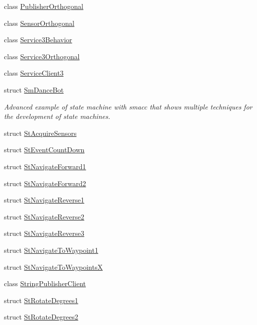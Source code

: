 \begin{DoxyCompactItemize}
\item 
class \hyperlink{classsm__dance__bot_1_1PublisherOrthogonal}{Publisher\+Orthogonal}
\item 
class \hyperlink{classsm__dance__bot_1_1SensorOrthogonal}{Sensor\+Orthogonal}
\item 
class \hyperlink{classsm__dance__bot_1_1Service3Behavior}{Service3\+Behavior}
\item 
class \hyperlink{classsm__dance__bot_1_1Service3Orthogonal}{Service3\+Orthogonal}
\item 
class \hyperlink{classsm__dance__bot_1_1ServiceClient3}{Service\+Client3}
\item 
struct \hyperlink{structsm__dance__bot_1_1SmDanceBot}{Sm\+Dance\+Bot}
\begin{DoxyCompactList}\small\item\em Advanced example of state machine with smacc that shows multiple techniques for the development of state machines. \end{DoxyCompactList}\item 
struct \hyperlink{structsm__dance__bot_1_1StAcquireSensors}{St\+Acquire\+Sensors}
\item 
struct \hyperlink{structsm__dance__bot_1_1StEventCountDown}{St\+Event\+Count\+Down}
\item 
struct \hyperlink{structsm__dance__bot_1_1StNavigateForward1}{St\+Navigate\+Forward1}
\item 
struct \hyperlink{structsm__dance__bot_1_1StNavigateForward2}{St\+Navigate\+Forward2}
\item 
struct \hyperlink{structsm__dance__bot_1_1StNavigateReverse1}{St\+Navigate\+Reverse1}
\item 
struct \hyperlink{structsm__dance__bot_1_1StNavigateReverse2}{St\+Navigate\+Reverse2}
\item 
struct \hyperlink{structsm__dance__bot_1_1StNavigateReverse3}{St\+Navigate\+Reverse3}
\item 
struct \hyperlink{structsm__dance__bot_1_1StNavigateToWaypoint1}{St\+Navigate\+To\+Waypoint1}
\item 
struct \hyperlink{structsm__dance__bot_1_1StNavigateToWaypointsX}{St\+Navigate\+To\+WaypointsX}
\item 
class \hyperlink{classsm__dance__bot_1_1StringPublisherClient}{String\+Publisher\+Client}
\item 
struct \hyperlink{structsm__dance__bot_1_1StRotateDegrees1}{St\+Rotate\+Degrees1}
\item 
struct \hyperlink{structsm__dance__bot_1_1StRotateDegrees2}{St\+Rotate\+Degrees2}

\end{DoxyCompactItemize}
